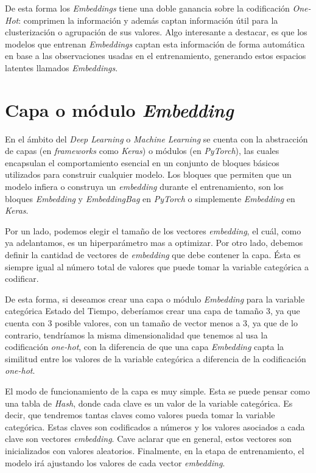 \documentclass[11pt,a4paper,twoside]{thesis}
\begin{document}
De esta forma los \textit{Embeddings} tiene una doble ganancia sobre la
codificación \textit{One-Hot}: comprimen la información y además captan
información útil para la clusterización o agrupación de sus valores. Algo
interesante a destacar, es que los modelos que entrenan \textit{Embeddings}
captan esta información de forma automática en base a las observaciones usadas
en el entrenamiento, generando estos espacios latentes llamados
\textit{Embeddings}.

\section{Capa o módulo \textit{Embedding}}

En el ámbito del \textit{Deep Learning} o \textit{Machine Learning} se cuenta
con la abstracción de capas (en \textit{frameworks} como \textit{Keras}) o
módulos (en \textit{PyTorch}), las cuales encapsulan el comportamiento esencial
en un conjunto de bloques básicos utilizados para construir cualquier modelo.
Los bloques que permiten que un modelo infiera o construya un
\textit{embedding} durante el entrenamiento, son los bloques \textit{Embedding}
y \textit{EmbeddingBag} en \textit{PyTorch} o simplemente \textit{Embedding} en
\textit{Keras}.

Por un lado, podemos elegir el tamaño de los vectores \textit{embedding}, el
cuál, como ya adelantamos, es un hiperparámetro mas a optimizar. Por otro
lado, debemos definir la cantidad de vectores de \textit{embedding} que debe
contener la capa. Ésta es siempre igual al número total de valores que puede
tomar la variable categórica a codificar.

De esta forma, si deseamos crear una capa o módulo \textit{Embedding} para la
variable categórica Estado del Tiempo, deberíamos crear una capa de tamaño 3,
ya que cuenta con 3 posible valores, con un tamaño de vector menos a 3, ya que
de lo contrario, tendríamos la misma dimensionalidad que tenemos al usa la
codificación \textit{one-hot}, con la diferencia de que una capa
\textit{Embedding} capta la similitud entre los valores de la variable
categórica a diferencia de la codificación \textit{one-hot}.

El modo de funcionamiento de la capa es muy simple. Esta se puede pensar como
una tabla de \textit{Hash}, donde cada clave es un valor de la variable
categórica. Es decir, que tendremos tantas claves como valores pueda tomar la
variable categórica. Estas claves son codificados a números y los valores
asociados a cada clave son vectores \textit{embedding}. Cave aclarar que en
general, estos vectores son inicializados con valores aleatorios. Finalmente,
en la etapa de entrenamiento, el modelo irá ajustando los valores de cada
vector \textit{embedding}.
\end{document}
